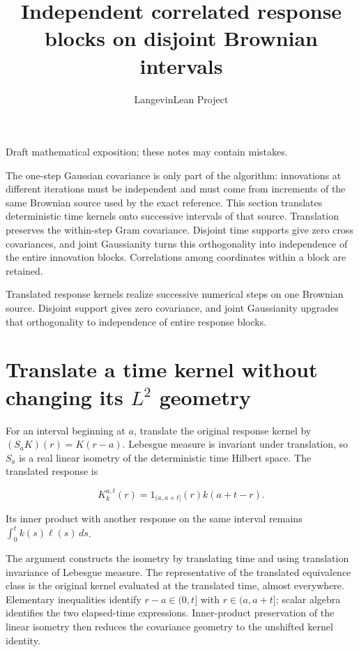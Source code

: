 \documentclass[11pt,a4paper]{article}
\title{\texorpdfstring{Independent correlated response blocks on disjoint Brownian intervals}{Independent correlated response blocks on disjoint Brownian intervals}}
\author{LangevinLean Project}
\date{}
\begin{document}
\maketitle
Draft mathematical exposition; these notes may contain mistakes.


The one-step Gaussian covariance is only part of the algorithm: innovations at different iterations must be independent and must come from increments of the same Brownian source used by the exact reference. This section translates deterministic time kernels onto successive intervals of that source. Translation preserves the within-step Gram covariance. Disjoint time supports give zero cross covariances, and joint Gaussianity turns this orthogonality into independence of the entire innovation blocks. Correlations among coordinates within a block are retained.



Translated response kernels realize successive numerical steps on one Brownian source. Disjoint support gives zero covariance, and joint Gaussianity upgrades that orthogonality to independence of entire response blocks.


\section{\texorpdfstring{Translate a time kernel without changing its \(L^{2}\) geometry}{Translate a time kernel without changing its L² geometry}}


For an interval beginning at \(a\), translate the original response kernel by \((S_aK)(r)=K(r-a)\). Lebesgue measure is invariant under translation, so \(S_a\) is a real linear isometry of the deterministic time Hilbert space. The translated response is

\[K^{a,t}_k(r)=1_{(a,a+t]}(r)k(a+t-r).\]

Its inner product with another response on the same interval remains \(\int_0^t k(s)\ell(s)\,ds\).



The argument constructs the isometry by translating time and using translation invariance of Lebesgue measure. The representative of the translated equivalence class is the original kernel evaluated at the translated time, almost everywhere. Elementary inequalities identify \(r-a\in(0,t]\) with \(r\in(a,a+t]\); scalar algebra identifies the two elapsed-time expressions. Inner-product preservation of the linear isometry then reduces the covariance geometry to the unshifted kernel identity.
\end{document}
